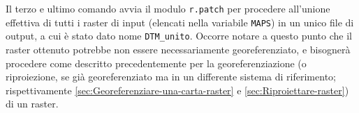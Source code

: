 		Il terzo e ultimo comando avvia il modulo \texttt{r.patch} per procedere all'unione effettiva di tutti i raster di input (elencati nella variabile \texttt{MAPS}) in un unico file di output, a cui è stato dato nome \texttt{DTM\_unito}. Occorre notare a questo punto che il raster ottenuto potrebbe non essere necessariamente georeferenziato, e bisognerà procedere come descritto precedentemente per la georeferenziazione (o riproiezione, se già georeferenziato ma in un differente sistema di riferimento; rispettivamente \textsection\ref{sec:Georeferenziare-una-carta-raster} e \ref{sec:Riproiettare-raster}) di un raster.
